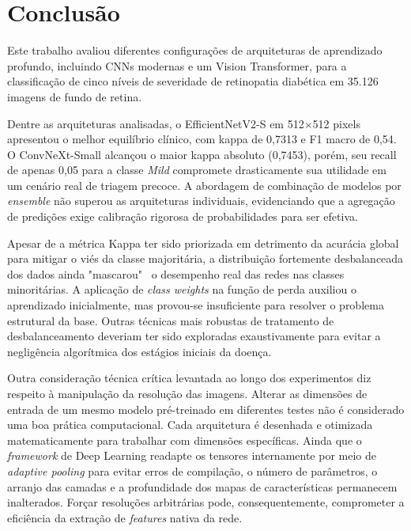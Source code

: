 \documentclass[conference]{IEEEtran}
\begin{document}
\section{Conclusão}

Este trabalho avaliou diferentes configurações de arquiteturas de aprendizado profundo, incluindo CNNs modernas e um Vision Transformer, para a classificação de cinco níveis de severidade de retinopatia diabética em 35.126 imagens de fundo de retina. 

Dentre as arquiteturas analisadas, o EfficientNetV2-S em 512$\times$512 pixels apresentou o melhor equilíbrio clínico, com kappa de 0,7313 e F1 macro de 0,54. O ConvNeXt-Small alcançou o maior kappa absoluto (0,7453), porém, seu recall de apenas 0,05 para a classe \textit{Mild} compromete drasticamente sua utilidade em um cenário real de triagem precoce. A abordagem de combinação de modelos por \textit{ensemble} não superou as arquiteturas individuais, evidenciando que a agregação de predições exige calibração rigorosa de probabilidades para ser efetiva.

Apesar de a métrica Kappa ter sido priorizada em detrimento da acurácia global para mitigar o viés da classe majoritária, a distribuição fortemente desbalanceada dos dados ainda "mascarou" \ o desempenho real das redes nas classes minoritárias. A aplicação de \textit{class weights} na função de perda auxiliou o aprendizado inicialmente, mas provou-se insuficiente para resolver o problema estrutural da base. Outras técnicas mais robustas de tratamento de desbalanceamento deveriam ter sido exploradas exaustivamente para evitar a negligência algorítmica dos estágios iniciais da doença.

Outra consideração técnica crítica levantada ao longo dos experimentos diz respeito à manipulação da resolução das imagens. Alterar as dimensões de entrada de um mesmo modelo pré-treinado em diferentes testes não é considerado uma boa prática computacional. Cada arquitetura é desenhada e otimizada matematicamente para trabalhar com dimensões específicas. Ainda que o \textit{framework} de Deep Learning readapte os tensores internamente por meio de \textit{adaptive pooling} para evitar erros de compilação, o número de parâmetros, o arranjo das camadas e a profundidade dos mapas de características permanecem inalterados. Forçar resoluções arbitrárias pode, consequentemente, comprometer a eficiência da extração de \textit{features} nativa da rede.
\end{document}
